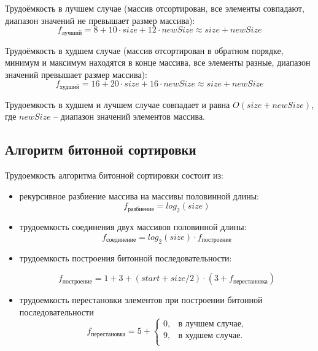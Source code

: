 Трудоёмкость в лучшем случае (массив отсортирован, все элементы совпадают, диапазон значений не превышает размер массива):
\begin{equation}
	\label{best_counting}
	f_{\text{лучший}} = 8 + 10 \cdot size + 12 \cdot newSize \approx size + newSize
\end{equation}

Трудоёмкость в худшем случае (массив отсортирован в обратном порядке, минимум и максимум находятся в конце массива, все элементы разные, диапазон значений превышает размер массива):
\begin{equation}
	\label{worst_counting}
	f_{\text{худший}} = 16 + 20 \cdot size + 16 \cdot newSize \approx size + newSize
\end{equation}

Трудоемкость в худшем и лучшем случае совпадает и равна $O(size + newSize)$, где $newSize$ -- диапазон значений элементов массива.

\subsection{Алгоритм битонной сортировки}

Трудоемкость алгоритма битонной сортировки состоит из:

\begin{itemize}
	\item рекурсивное разбиение массива на массивы половинной длины:
	\begin{equation}
		\label{worst_counting}
		f_{\text{разбиение}} = log_2{(size)}
	\end{equation}

	\item трудоемкость соединения двух массивов половинной длины:
	\begin{equation}
		\label{worst_counting}
		f_{\text{соединение}} = log_2{(size)} \cdot f_{\text{построение}}
	\end{equation}
	
	\item трудоемкость построения битонной последовательности:
	
	\begin{equation}
		\label{bitonic}
		f_{\text{построение}} = 1 + 3 + (start + size / 2) \cdot (3 + f_{\text{перестановка}})
	\end{equation}

	\item трудоемкость перестановки элементов при построении битонной последовательности
	\begin{equation}
		\label{bitonic}
		f_{\text{перестановка}} = 5 + \begin{cases}
			0, & \text{в лучшем случае},\\
			9, & \text{в худшем случае}.\\
		\end{cases}
	\end{equation} 	
\end{itemize}

